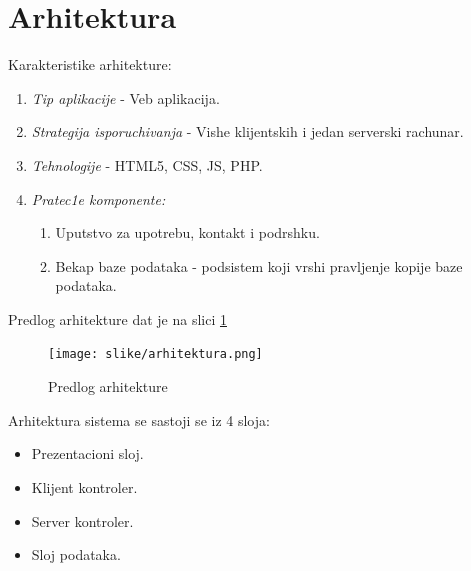 \documentclass[10 pt]{article}
\begin{document}
	\section{Arhitektura}
		
		Karakteristike arhitekture:
		\begin{enumerate}
			\item\textit{Tip aplikacije} - Veb aplikacija.
			\item\textit{Strategija isporuchivanja} - Vishe klijent{s}kih i jedan serverski rachunar.
			\item\textit{Tehnologije} - HTML5, CSS, JS, PHP.
			\item\textit{Pratec1e komponente:}
				\begin{enumerate}
					\item Uputstvo za upotrebu, kontakt i podrshku.
					\item Bekap baze podataka - podsistem koji vrshi pravljenje kopije baze podataka.
				\end{enumerate}
		\end{enumerate}
		
		
		Predlog arhitekture dat je na slici \ref{fig:Arhitektura}
		
		\begin{figure}[H]
			\centering
			\texttt{[image: slike/arhitektura.png]}\\
			\caption{Predlog arhitekture}
			\label{fig:Arhitektura}
		\end{figure}
		
			
		Arhitektura sistema se sastoji se iz 4 sloja:
			\begin{itemize}
				\item Prezentacioni sloj.
				\item Klijent kontroler.
				\item Server kontroler.
				\item Sloj podataka.
			\end{itemize}	
\end{document}
